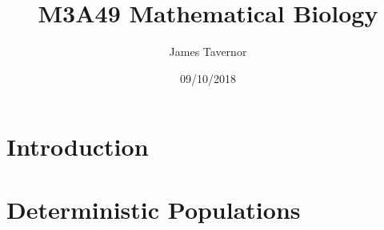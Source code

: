 \documentclass[a4paper]{report}
\title{M3A49 Mathematical Biology}
\author{James Tavernor}
\date{09/10/2018}
\begin{document}
\maketitle

\chapter{Introduction}


\chapter{Deterministic Populations}




\end{document}
